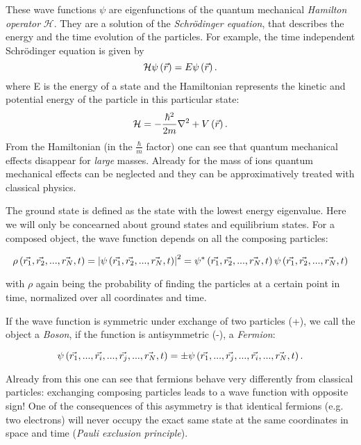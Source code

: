 These wave functions $\psi$ are eigenfunctions of the quantum mechanical \emph{Hamilton operator} $\mathcal{H}$. They are a solution of the \emph{Schr\"odinger equation}, that describes the energy and the time evolution of the particles. For example, the time independent Schr\"odinger equation is given by
\begin{equation}
\mathcal{H}\psi\left(\vec{r}\right) = E \psi\left(\vec{r}\right).
\end{equation}
where E is the energy of a state and the Hamiltonian represents the kinetic and potential energy of the particle in this particular state:
\begin{equation}
\mathcal{H} = - \frac{\hbar^2}{2m} \nabla^2  +V\left(\vec{r}\right).
\end{equation}
From the Hamiltonian (in the $\frac{\hbar}{m}$ factor) one can see that quantum mechanical effects disappear for \emph{large} masses. Already for the mass of ions quantum mechanical effects can be neglected and they can be approximatively treated with classical physics.

The ground state is defined as the state with the lowest energy eigenvalue. Here we will only be concearned about ground states and equilibrium states. For a composed object, the wave function depends on all the composing particles:

\begin{equation}
\rho\left(\vec{r_1},\vec{r_2},...,\vec{r_N},t\right) = \left|\psi\left(\vec{r_1},\vec{r_2},...,\vec{r_N},t\right)\right|^2 = \psi^*\left(\vec{r_1},\vec{r_2},...,\vec{r_N},t\right)\psi\left(\vec{r_1},\vec{r_2},...,\vec{r_N},t\right)
\end{equation}

\noindent
with $\rho$ again being the probability of finding the particles at a certain point in time, normalized over all coordinates and time. 

If the wave function is symmetric under exchange of two particles (+), we call the object a \emph{Boson}, if the function is antisymmetric (-), a \emph{Fermion}:


\begin{equation}
 \psi\left(\vec{r_1},...,\vec{r_i},...,\vec{r_j},...,\vec{r_N},t\right) = \pm \psi\left(\vec{r_1},...,\vec{r_j},...,\vec{r_i},...,\vec{r_N},t\right).
\end{equation}

Already from this one can see that fermions behave very differently from classical particles: exchanging composing particles leads to a wave function with opposite sign! One of the consequences of this asymmetry is that identical fermions (e.g. two electrons) will never occupy the exact same state at the same coordinates in space and time (\emph{Pauli exclusion principle}).


